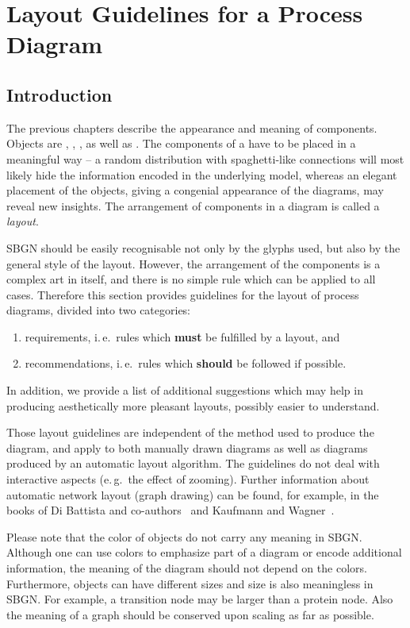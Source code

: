 \chapter{Layout Guidelines for a Process Diagram}
\label{chp:layout}

\section{Introduction}

The previous chapters describe the appearance and meaning of
\SBGNPDLone components. Objects are , , 
,  as well as . The components of a \PD
have to be placed in a meaningful way -- a random
distribution with spaghetti-like connections will most likely hide
the information encoded in the underlying model, whereas an elegant
placement of the objects, giving a congenial appearance of the
diagrams, may reveal new insights. The arrangement of components in a
diagram is called a \emph{layout}.

SBGN \PDs should be easily recognisable not only by the
glyphs used, but also by the general style of the layout. However, the
arrangement of the components is a complex art in itself, and there is
no simple rule which can be applied to all cases. Therefore this
section provides guidelines for the layout of process diagrams, divided
into two categories:
\begin{enumerate}
  \item requirements, i.\,e.~rules which \textbf{must} be fulfilled by a
  layout, and
  \item recommendations, i.\,e.~rules which \textbf{should} be followed if
  possible. 
\end{enumerate}
In addition, we provide a list of additional suggestions which may help in producing aesthetically more pleasant layouts, possibly easier to understand.

Those layout guidelines are independent of the method used to produce
the diagram, and apply to both manually drawn diagrams as well as
diagrams produced by an automatic layout algorithm. The guidelines do
not deal with interactive aspects (e.\,g.~the effect of zooming). Further information about automatic network layout
(graph drawing) can be found, for example, in the books of Di Battista and
co-authors~\cite{DiBattista:1998} and Kaufmann and Wagner~\cite{Kaufmann:2001}.

Please note that the color of objects do not carry any meaning in
SBGN. Although one can use colors to emphasize part of a diagram or
encode additional information, the meaning of the diagram should not
depend on the colors. Furthermore, objects can have different sizes
and size is also meaningless in SBGN. For example, a transition node
may be larger than a protein node. Also the meaning of a graph
should be conserved upon scaling as far as possible.

